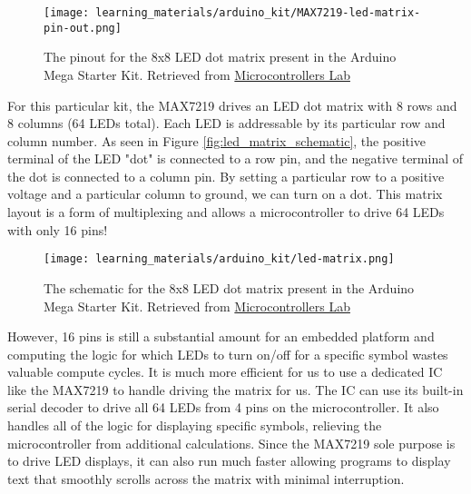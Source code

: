     \begin{figure}[h!]
        \texttt{[image: learning\_materials/arduino\_kit/MAX7219-led-matrix-pin-out.png]}
        \caption[LED Matrix Pinout]{The pinout for the 8x8 LED dot matrix present in the Arduino Mega Starter Kit. 
        Retrieved from \href{https://microcontrollerslab.com/wp-content/uploads/2021/09/MAX7219-led-matrix-pin-out.jpg?ezimgfmt=ng:webp/ngcb1}{Microcontrollers Lab}}
    \end{figure}


    For this particular kit, the MAX7219 drives an LED dot matrix with 8 rows and 8 columns (64 LEDs total). 
    Each LED is addressable by its particular row and column number.
    As seen in Figure \ref{fig:led_matrix_schematic}, the positive terminal of the LED "dot" is connected to a row pin, and the negative terminal of the dot is connected to a column pin.
    By setting a particular row to a positive voltage and a particular column to ground, we can turn on a dot.
    This matrix layout is a form of multiplexing and allows a microcontroller to drive 64 LEDs with only 16 pins!

    \begin{figure}[b!]
        \texttt{[image: learning\_materials/arduino\_kit/led-matrix.png]}
        \caption[LED Matrix Schematic]{The schematic for the 8x8 LED dot matrix present in the Arduino Mega Starter Kit. 
        Retrieved from \href{https://microcontrollerslab.com/wp-content/uploads/2016/11/led-matrix.jpg?ezimgfmt=ng:webp/ngcb1}{Microcontrollers Lab}}
    \end{figure}

    However, 16 pins is still a substantial amount for an embedded platform and computing the logic for which LEDs to turn on/off for a specific symbol wastes valuable compute cycles.
    It is much more efficient for us to use a dedicated IC like the MAX7219 to handle driving the matrix for us. 
    The IC can use its built-in serial decoder to drive all 64 LEDs from 4 pins on the microcontroller.
    It also handles all of the logic for displaying specific symbols, relieving the microcontroller from additional calculations.
    Since the MAX7219 sole purpose is to drive LED displays, it can also run much faster allowing programs to display text that smoothly scrolls across the matrix with minimal interruption.
    
